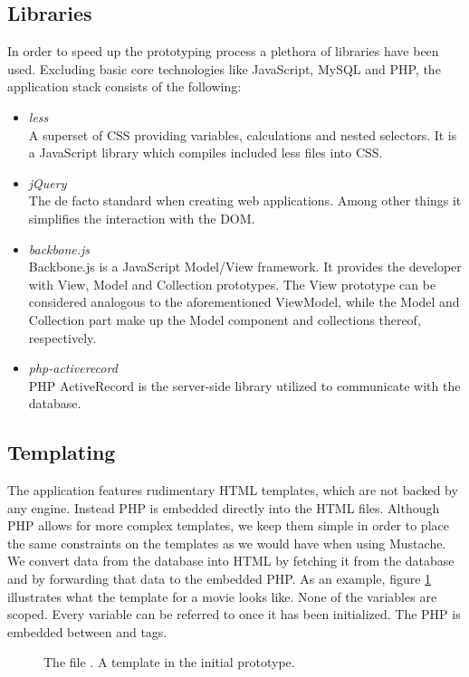 \subsection{Libraries}
In order to speed up the prototyping process a plethora of libraries have been
used. Excluding basic core technologies like JavaScript, MySQL and PHP, the
application stack consists of the following:
\begin{itemize}
	\item \emph{less}\\
	A superset of CSS providing variables, calculations and nested selectors. It
	is a JavaScript library which compiles included less files into CSS.
	\item \emph{jQuery}\\
	The de facto standard when creating web applications. Among other things it
	simplifies the interaction with the DOM.
	\item \emph{backbone.js}\\
	Backbone.js is a JavaScript Model/View framework. It provides the developer
	with View, Model and Collection prototypes. The View prototype can be
	considered analogous to the aforementioned ViewModel, while the Model and
	Collection part make up the Model component and collections thereof,
	respectively.
	\item \emph{php-activerecord}\\
	PHP ActiveRecord is the server-side library utilized to communicate with the
	database.
\end{itemize}

\subsection{Templating}
The application features rudimentary HTML templates, which are not backed by
any engine. Instead PHP is embedded directly into the HTML files.
Although PHP allows for more complex templates, we keep them simple in order to
place the same constraints on the templates as we would have when using
Mustache.
We convert data from the database into HTML by fetching it from the database and
by forwarding that data to the embedded PHP.
As an example, figure \ref{fig:movie.view.tpl} illustrates what the template
for a movie looks like.
None of the variables are scoped. Every variable can be referred to once it has
been initialized.
The PHP is embedded between  and  tags.

\begin{figure}
	\label{fig:movie.view.tpl}
	\centering
	
	\caption{
		The file .
		A template in the initial prototype.}
\end{figure}

